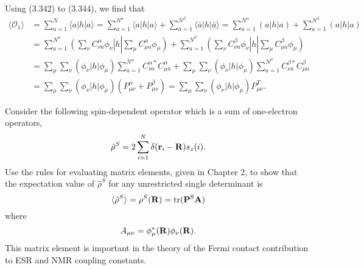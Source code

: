 \documentclass[a4paper]{book}
\newcounter{exercise}[chapter]
\newcounter{solution}[chapter]
\newcommand\tr[1]{\mathrm{tr(#1)}}
\newcommand{\R}{{\bf R}}
\begin{document}
	\begin{solution}
	
	Using (3.342) to (3.344), we find that
	\begin{align*}
		\langle \mathscr{O}_1 \rangle &= \sum_{ a=1 }^N \langle a | h | a \rangle = \sum_{ a=1 }^{N^\alpha} \langle a | h | a \rangle + \sum_{ \bar{a}=1 }^{N^\beta} \langle \bar{a} | h | \bar{a} \rangle = \sum_{ a=1 }^{N^\alpha} ( a | h | a ) + \sum_{ a=1 }^{N^\beta} ( a | h | a ) \\
		&= \sum_{ a=1 }^{N^\alpha} \left( \sum_\nu C^\alpha_{\nu a} \phi_\nu \right| h \left| \sum_\mu C^\alpha_{\mu a} \phi_\mu \right) + \sum_{ a=1 }^{N^\beta} \left( \sum_\nu C^\beta_{\nu a} \phi_\nu \right| h \left| \sum_\mu C^\beta_{\mu a} \phi_\mu \right) \\
		&= \sum_\mu \sum_\nu ( \phi_\nu | h | \phi_\mu ) \sum_{ a=1 }^{N^\alpha} C^{\alpha*}_{\nu a} C^\alpha_{\mu a} + \sum_\mu \sum_\nu ( \phi_\nu | h | \phi_\mu ) \sum_{ a=1 }^{N^\beta} C^{\beta*}_{\nu a} C^\beta_{\mu a} \\
		&= \sum_\mu \sum_\nu ( \phi_\nu | h | \phi_\mu ) ( P^\alpha_{\mu \nu} + P^\beta_{\mu \nu} ) = \sum_\mu \sum_\nu ( \phi_\nu | h | \phi_\mu ) P^T_{\mu \nu} .
	\end{align*}		
	
	\end{solution}
	
	\begin{exercise}
	Consider the following spin-dependent operator which is a sum of one-electron operators,
	\[
		\hat{\rho}^S = 2 \sum_{i=1}^N \delta( {\bf r}_i - {\bf R} )s_z(i).
	\]
	Use the rules for evaluating matrix elements, given in Chapter 2, to show that the expectation value of $\hat{\rho}^S$ for any unrestricted single determinant is
	\[
		\langle \hat{\rho}^S \rangle = \rho^S ({\bf R}) = \tr{  {\bf P}^S {\bf A}} 
	\]
	where
	\[
		A_{\mu\nu} = \phi^*_\mu (\R) \phi_\nu (\R).
	\]
	This matrix element is important in the theory of the Fermi contact contribution to ESR and NMR coupling constants.
	\end{exercise}
	
\end{document}
